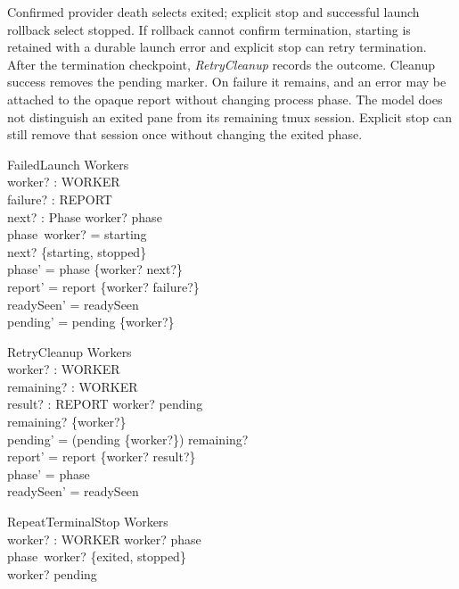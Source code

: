 \documentclass[a4paper,10pt,fleqn]{article}
\begin{document}
Confirmed provider death selects exited; explicit stop and successful launch
rollback select stopped. If rollback cannot confirm termination, starting is
retained with a durable launch error and explicit stop can retry termination.
After the termination checkpoint, \textit{RetryCleanup} records the outcome.
Cleanup success removes the pending marker. On failure it remains, and an error
may be attached to the opaque report without changing process phase. The model
does not distinguish an exited pane from its remaining tmux session. Explicit
stop can still remove that session once without changing the exited phase.

\begin{schema}{FailedLaunch}
  \Delta Workers \\
  worker? : WORKER \\
  failure? : REPORT \\
  next? : Phase
\where
  worker? \in \dom phase \\
  phase~worker? = starting \\
  next? \in \{starting, stopped\} \\
  phase' = phase \oplus \{worker? \mapsto next?\} \\
  report' = report \oplus \{worker? \mapsto failure?\} \\
  readySeen' = readySeen \\
  pending' = pending \cup \{worker?\}
\end{schema}

\begin{schema}{RetryCleanup}
  \Delta Workers \\
  worker? : WORKER \\
  remaining? : \power WORKER \\
  result? : REPORT
\where
  worker? \in pending \\
  remaining? \subseteq \{worker?\} \\
  pending' = (pending \setminus \{worker?\}) \cup remaining? \\
  report' = report \oplus \{worker? \mapsto result?\} \\
  phase' = phase \\
  readySeen' = readySeen
\end{schema}

\begin{schema}{RepeatTerminalStop}
  \Xi Workers \\
  worker? : WORKER
\where
  worker? \in \dom phase \\
  phase~worker? \in \{exited, stopped\} \\
  worker? \notin pending
\end{schema}
\end{document}
